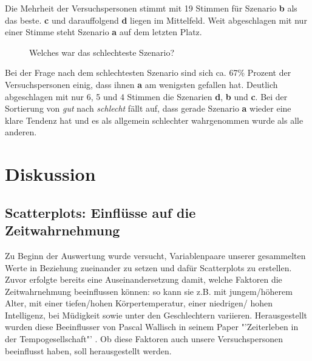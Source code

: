 \documentclass{Paper}
\begin{document}
Die Mehrheit der Versuchspersonen stimmt mit 19 Stimmen für Szenario \textbf{b} als das beste. \textbf{c} und darauffolgend \textbf{d} liegen im Mittelfeld. Weit abgeschlagen mit nur einer Stimme steht Szenario \textbf{a} auf dem letzten Platz.
	
	
	\begin{figure}[ht]
\caption{Welches war das schlechteste Szenario?}
\label{SzenarioSchlecht}
\end{figure}
	

Bei der Frage nach dem schlechtesten Szenario sind sich ca. 67\% Prozent der Versuchspersonen einig, dass ihnen \textbf{a} am wenigsten gefallen hat. Deutlich abgeschlagen mit nur 6, 5 und 4 Stimmen die Szenarien \textbf{d}, \textbf{b} und \textbf{c}. 
Bei der Sortierung von \textit{gut} nach \textit{schlecht} fällt auf, dass gerade Szenario \textbf{a} wieder eine klare Tendenz hat und es als allgemein schlechter wahrgenommen wurde als alle anderen.


\section{Diskussion}

\subsection{Scatterplots: Einflüsse auf die Zeitwahrnehmung}
Zu Beginn der Auswertung wurde versucht, Variablenpaare unserer gesammelten Werte in Beziehung zueinander zu setzen und dafür Scatterplots zu erstellen. Zuvor erfolgte bereits eine Auseinandersetzung damit, welche Faktoren die Zeitwahrnehmung beeinflussen können: so kann sie z.B. mit jungem/höherem Alter, mit einer tiefen/hohen Körpertemperatur, einer niedrigen/ hohen Intelligenz, bei Müdigkeit sowie unter den Geschlechtern variieren. Herausgestellt wurden diese Beeinflusser von Pascal Wallisch in seinem Paper "'Zeiterleben in der Tempogesellschaft"' \cite{Wallisch2003}. Ob diese Faktoren auch unsere Versuchspersonen beeinflusst haben, soll herausgestellt werden.
\end{document}
